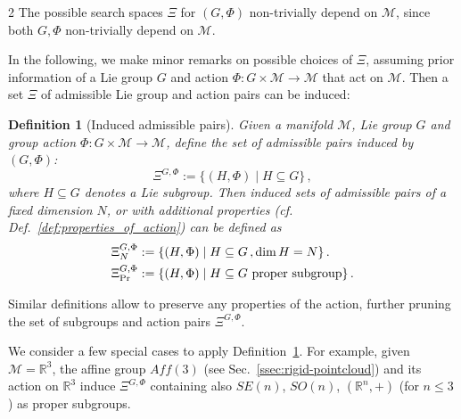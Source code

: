 \documentclass{article}
\newtheorem{definition}[theorem]{Definition}
\newcommand{\M}{\mathcal{M}}                                %
\newcommand{\g}{\mathfrak{g}}                               %
\newcommand{\R}{\mathbb{R}}                                 %
\begin{document}
\begin{multicols}{2}
The possible search spaces $\Xi$ for $(G,\Phi)$ non-trivially depend on $\M$, since both $G,\Phi$ non-trivially depend on $\M$.%

In the following, we make minor remarks on possible choices of $\Xi$, assuming prior information of a Lie group $G$ and action $\Phi:G\times\M\rightarrow\M$ that act on $\M$. Then a set $\Xi$ of admissible Lie group and action pairs can be induced:
\begin{definition}[Induced admissible pairs]\label{def:induced_admissible_pairs}
    Given a manifold $\M$, Lie group $G$ and group action $\Phi:G\times\M\rightarrow\M$, define the set of admissible pairs induced by $(G,\Phi)$:
    \begin{equation}
        \Xi^{G,\Phi} := \{ (H,\Phi) \;|\; H \subseteq G \}\,,
    \end{equation} 
    where $H\subseteq G$ denotes a Lie subgroup. Then induced sets of admissible pairs of a fixed dimension $N$, or with additional properties (cf. Def.~\ref{def:properties_of_action}) can be defined as 
    \begin{align}
        \Xi^{G,\Phi}_N &:= \{ (H,\Phi) \;|\; H \subseteq G\,, \dim H = N \}\,. \\
        \Xi^{G,\Phi}_{\textnormal{Pr}} &:= \{ (H,\Phi) \;|\; H \subseteq G  \textnormal{ \normalfont proper subgroup} \}\,.
    \end{align} 
\end{definition}
Similar definitions allow to preserve any properties of the action, further pruning the set of subgroups and action pairs $\Xi^{G,\Phi}$. 

We consider a few special cases to apply Definition~\ref{def:induced_admissible_pairs}. For example, given $\M = \R^3$, the affine group $Aff(3)$ (see Sec.~\ref{ssec:rigid-pointcloud}) and its action on $\R^3$ induce $\Xi^{G,\Phi}$ containing also $SE(n)$, $SO(n)$, $(\R^n,+)$ (for $n \leq 3$) as proper subgroups.  %


\end{multicols}
\end{document}
